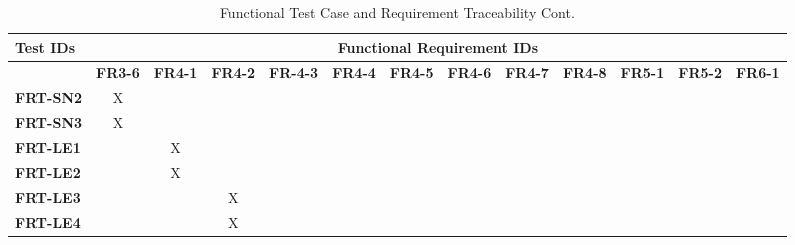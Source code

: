 \documentclass[12pt, titlepage]{article}
\begin{document}
\begin{landscape}
	\newpage
	\begin{longtable}{|l|cccccccccccc|}
		\caption{Functional Test Case and Requirement Traceability Cont.}                                                                                                                                                                                                  \\
		\hline
		\textbf{Test IDs}   & \multicolumn{12}{c|}{\textbf{Functional Requirement IDs}}                                                                                                                                                                                                                 \\
		\hline
		~                   & \textbf{FR3-6}  & \textbf{FR4-1}  & \textbf{FR4-2} & \textbf{FR-4-3} & \textbf{FR4-4} & \textbf{FR4-5} & \textbf{FR4-6} & \textbf{FR4-7} & \textbf{FR4-8} &  \textbf{FR5-1} & \textbf{FR5-2} & \textbf{FR6-1} \\
		\hline
		\textbf{FRT-SN2} & X                                                         & ~             & ~             & ~             & ~             & ~             & ~             & ~             & ~             & ~             & ~ &~\\
		\textbf{FRT-SN3} & X                                                         & ~             & ~             & ~             & ~             & ~             & ~             & ~             & ~             & ~             & ~ &~\\
		\textbf{FRT-LE1} & ~                                                         & X             & ~             & ~             & ~             & ~             & ~             & ~             & ~             & ~             & ~ &~\\
		\textbf{FRT-LE2} & ~                                                         & X             & ~             & ~             & ~             & ~             & ~             & ~             & ~             & ~             & ~ &~\\
		\textbf{FRT-LE3} & ~                                                         & ~             & X             & ~             & ~             & ~             & ~             & ~             & ~             & ~             & ~ &~\\
		\textbf{FRT-LE4} & ~                                                         & ~             & X             & ~             & ~             & ~             & ~             & ~             & ~             & ~             & ~ &~\\

\end{longtable}
\end{landscape}
\end{document}
